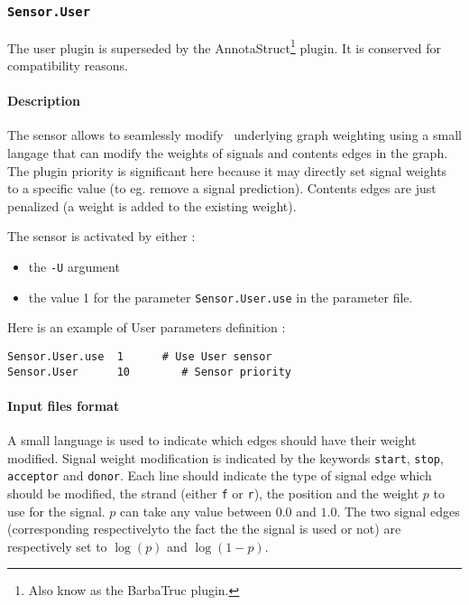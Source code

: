 
\subsubsection{\texttt{Sensor.User}}
\label{pluguser}

The user plugin is superseded by the AnnotaStruct\footnote{Also know
  as the BarbaTruc plugin.} plugin. It is conserved for compatibility
reasons.

\paragraph{Description}

The sensor allows to seamlessly modify \EuGene\ underlying graph
weighting using a small langage that can modify the weights of signals
and contents edges in the graph. The plugin priority is significant
here because it may directly set signal weights to a specific value
(to eg. remove a signal prediction). Contents edges are just penalized
(a weight is added to the existing weight).

The sensor is activated by either :
\begin{itemize}
\item the \texttt{-U} argument 
\item the value 1 for the parameter \texttt{Sensor.User.use} in the
  parameter file.
\end{itemize}
Here is an example of User parameters definition :
\begin{Verbatim}[fontsize=\small]
Sensor.User.use  1      # Use User sensor
Sensor.User      10        # Sensor priority
\end{Verbatim}

\paragraph{Input files format}

A small language is used to indicate which edges should have their
weight modified. Signal weight modification is indicated by the
keywords \texttt{start}, \texttt{stop}, \texttt{acceptor} and
\texttt{donor}. Each line should indicate the type of signal edge
which should be modified, the strand (either \texttt{f} or
\texttt{r}), the position and the weight $p$ to use for the signal.
$p$ can take any value between $0.0$ and $1.0$. The two signal edges
(corresponding respectivelyto the fact the the signal is used or not)
are respectively set to $\log(p)$ and $\log(1-p)$.

